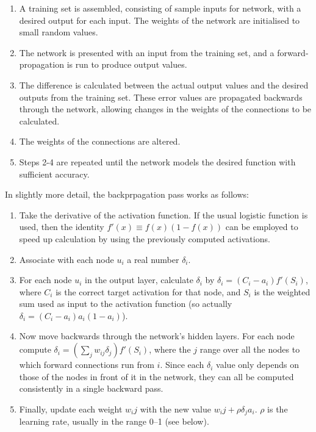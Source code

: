 \begin{enumerate}

\item A training set is assembled, consisting of sample inputs for
  network, with a desired output for each input. The weights of the
  network are initialised to small random values.

\item The network is presented with an input from the training set,
  and a forward-propagation is run to produce output values.

\item The difference is calculated between the actual output values
  and the desired outputs from the training set. These error values are
  propagated backwards through the network, allowing changes in the
  weights of the connections to be calculated.

\item The weights of the connections are altered.

\item Steps 2-4 are repeated until the network models the desired
  function with sufficient accuracy.

\end{enumerate}

In slightly more detail, the backprpagation pass works as follows:

\begin{enumerate}
  
\item Take the derivative of the activation function. If the usual
  logistic function is used, then the identity $f'(x) \equiv
  f(x)(1-f(x))$ can be employed to speed up calculation by using the
  previously computed activations.
  
\item Associate with each node $u_i$ a real number $\delta_i$.
  
\item For each node $u_i$ in the output layer, calculate $\delta_i$ by
  $\delta_i = (C_i - a_i)f'(S_i)$, where $C_i$ is the correct target
  activation for that node, and $S_i$ is the weighted sum used as
  input to the activation function (so actually $\delta_i = (C_i -
  a_i)a_i(1-a_i)$).
  
\item Now move backwards through the network's hidden layers. For each
  node compute $\delta_i = (\sum_j w_{ij}\delta_j)f'(S_i)$, where the
  $j$ range over all the nodes to which forward connections run from
  $i$. Since each $\delta_i$ value only depends on those of the nodes
  in front of it in the network, they can all be computed consistently
  in a single backward pass.

\item Finally, update each weight $w_ij$ with the new value $w_ij +
  \rho \delta_j a_i$. $\rho$ is the learning rate, usually in the
  range 0--1 (see below).

\end{enumerate}


